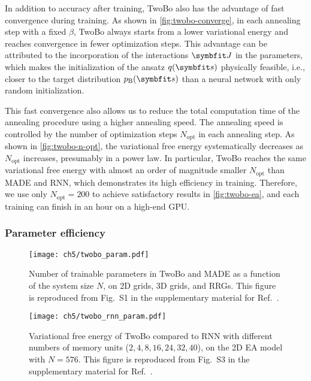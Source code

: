 In addition to accuracy after training, TwoBo also has the advantage of fast convergence during training. As shown in \cref{fig:twobo-converge}, in each annealing step with a fixed $\beta$, TwoBo always starts from a lower variational energy and reaches convergence in fewer optimization steps. This advantage can be attributed to the incorporation of the interactions $\mJ$ in the parameters, which makes the initialization of the ansatz $q(\vs)$ physically feasible, i.e., closer to the target distribution $p_\text{B}(\vs)$ than a neural network with only random initialization.

This fast convergence also allows us to reduce the total computation time of the annealing procedure using a higher annealing speed. The annealing speed is controlled by the number of optimization steps $N_\text{opt}$ in each annealing step. As shown in \cref{fig:twobo-n-opt}, the variational free energy systematically decreases as $N_\text{opt}$ increases, presumably in a power law. In particular, TwoBo reaches the same variational free energy with almost an order of magnitude smaller $N_\text{opt}$ than MADE and RNN, which demonstrates its high efficiency in training. Therefore, we use only $N_\text{opt} = 200$ to achieve satisfactory results in \cref{fig:twobo-ea}, and each training can finish in an hour on a high-end GPU.

\vfill

\subsubsection{Parameter efficiency}

\begin{figure}[htb]
\centering
\texttt{[image: ch5/twobo\_param.pdf]}
\caption[Number of parameters vs.\ system size for TwoBo and MADE]{
Number of trainable parameters in TwoBo and MADE as a function of the system size $N$, on 2D grids, 3D grids, and RRGs.
This figure is reproduced from Fig.~S1 in the supplementary material for Ref.~\cite{biazzo2024sparse}.
}
\label{fig:twobo-param}
\end{figure}

\begin{figure}[htb]
\centering
\texttt{[image: ch5/twobo\_rnn\_param.pdf]}
\caption[Variational free energy vs.\ number of parameters for TwoBo and RNN]{
Variational free energy of TwoBo compared to RNN with different numbers of memory units ($2, 4, 8, 16, 24, 32, 40$), on the 2D EA model with $N = 576$.
This figure is reproduced from Fig.~S3 in the supplementary material for Ref.~\cite{biazzo2024sparse}.
}
\label{fig:twobo-rnn-param}
\end{figure}

